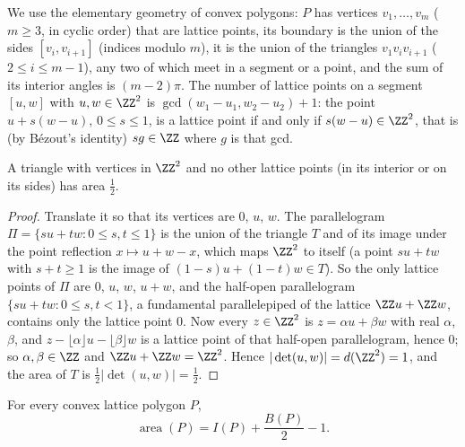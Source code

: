 We use the elementary geometry of convex polygons: $P$ has vertices $v_1, \ldots, v_m$ ($m \geq 3$, in cyclic order) that are lattice points, its boundary is the union of the sides
$[v_i, v_{i+1}]$ (indices modulo $m$), it is the union of the triangles $v_1v_iv_{i+1}$ ($2 \leq i \leq m - 1$), any two of which meet in a segment or a point, and the sum of its interior angles is
$(m - 2)\pi$. The number of lattice points on a segment $[u, w]$ with $u, w \in \ZZ^2$ is $\gcd(w_1 - u_1, w_2 - u_2) + 1$: the point $u + s(w - u)$, $0 \leq s \leq 1$, is a lattice point if and only if
$s(w - u) \in \ZZ^2$, that is (by B\'ezout's identity) $sg \in \ZZ$ where $g$ is that gcd.

\begin{lemma}\label{geometry-of-numbers:lemma-primitive-triangle}
A triangle with vertices in $\ZZ^2$ and no other lattice points (in its interior or on its sides) has area $\frac12$.
\end{lemma}

\begin{proof}
Translate it so that its vertices are $0$, $u$, $w$. The parallelogram $\Pi = \{su + tw : 0 \leq s, t \leq 1\}$ is the union of the triangle $T$ and of its image under the point reflection
$x \mapsto u + w - x$, which maps $\ZZ^2$ to itself (a point $su + tw$ with $s + t \geq 1$ is the image of $(1 - s)u + (1 - t)w \in T$). So the only lattice points of $\Pi$ are $0$, $u$, $w$, $u + w$, and the
half-open parallelogram $\{su + tw : 0 \leq s, t < 1\}$, a fundamental parallelepiped of the lattice $\ZZ u + \ZZ w$, contains only the lattice point $0$. Now every $z \in \ZZ^2$ is $z = \alpha u + \beta w$
with real $\alpha$, $\beta$, and $z - \lfloor\alpha\rfloor u - \lfloor\beta\rfloor w$ is a lattice point of that half-open parallelogram, hence $0$; so $\alpha, \beta \in \ZZ$ and $\ZZ u + \ZZ w = \ZZ^2$.
Hence $|\det(u, w)| = d(\ZZ^2) = 1$, and the area of $T$ is $\frac12|\det(u, w)| = \frac12$.
\end{proof}

\begin{theorem}[Pick]\label{geometry-of-numbers:theorem-pick}
For every convex lattice polygon $P$,
\[
\operatorname{area}(P) = I(P) + \frac{B(P)}{2} - 1.
\]
\end{theorem}

